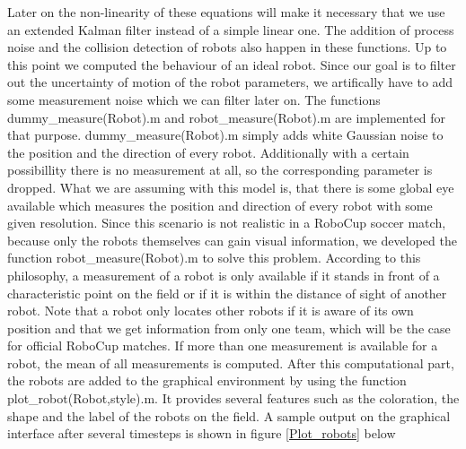 
\parskip 20pt

Later on the non-linearity of these equations will make it necessary that we use an extended Kalman filter instead of a simple linear one. The addition of process noise and the collision detection of robots also happen in these functions. Up to this point we computed the behaviour of an ideal robot. Since our goal is to filter out the uncertainty of motion of the robot parameters, we artifically have to add some measurement noise which we can filter later on. The functions {\selectfont dummy\_measure(Robot).m} and {\selectfont robot\_measure(Robot).m} are implemented for that purpose. {\selectfont dummy\_measure(Robot).m} simply adds white Gaussian noise to the position and the direction of every robot. Additionally with a certain possibillity there is no measurement at all, so the corresponding parameter is dropped. What we are assuming with this model is, that there is some global eye available which measures the position and direction of every robot with some given resolution. Since this scenario is not realistic in a RoboCup soccer match, because only the robots themselves can gain visual information, we developed the function {\selectfont robot\_measure(Robot).m} to solve this problem. According to this philosophy, a measurement of a robot is only available if it stands in front of a characteristic point on the field or if it is within the distance of sight of another robot. Note that a robot only locates other robots if it is aware of its own position and that we get information from only one team, which will be the case for official RoboCup matches. If more than one measurement is available for a robot, the mean of all measurements is computed.
\parskip 10pt
After this computational part, the robots are added to the graphical environment by using the function
{\selectfont plot\_robot(Robot,style).m}. It provides several features such as the coloration, the shape and the label of the robots on the field. A sample output on the graphical interface after several timesteps is shown in figure \ref{Plot_robots} below

